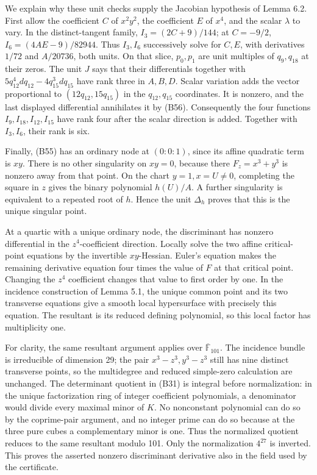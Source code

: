 \documentclass[
]{article}
\begin{document}
We explain why these unit checks supply the Jacobian hypothesis of Lemma
6.2. First allow the coefficient \(C\) of \(x^2y^2\), the coefficient
\(E\) of \(x^4\), and the scalar \(\lambda\) to vary. In the
distinct-tangent family, \(I_3=(2C+9)/144\); at \(C=-9/2\),
\(I_6=(4AE-9)/82944\). Thus \(I_3,I_6\) successively solve for \(C,E\),
with derivatives \(1/72\) and \(A/20736\), both units. On that slice,
\(p_0,p_1\) are unit multiples of \(q_9,q_{18}\) at their zeros. The
unit \(J\) says that their differentials together with
\(5q_{12}^4dq_{12}-4q_{15}^3dq_{15}\) have rank three in \(A,B,D\).
Scalar variation adds the vector proportional to \((12q_{12},15q_{15})\)
in the \(q_{12},q_{15}\) coordinates. It is nonzero, and the last
displayed differential annihilates it by (B56). Consequently the four
functions \(I_9,I_{18},I_{12},I_{15}\) have rank four after the scalar
direction is added. Together with \(I_3,I_6\), their rank is six.

Finally, (B55) has an ordinary node at \((0:0:1)\), since its affine
quadratic term is \(xy\). There is no other singularity on \(xy=0\),
because there \(F_z=x^3+y^3\) is nonzero away from that point. On the
chart \(y=1,x=U\ne0\), completing the square in \(z\) gives the binary
polynomial \(h(U)/A\). A further singularity is equivalent to a repeated
root of \(h\). Hence the unit \(\Delta_h\) proves that this is the
unique singular point.

At a quartic with a unique ordinary node, the discriminant has nonzero
differential in the \(z^4\)-coefficient direction. Locally solve the two
affine critical-point equations by the invertible \(xy\)-Hessian.
Euler's equation makes the remaining derivative equation four times the
value of \(F\) at that critical point. Changing the \(z^4\) coefficient
changes that value to first order by one. In the incidence construction
of Lemma 5.1, the unique common point and its two transverse equations
give a smooth local hypersurface with precisely this equation. The
resultant is its reduced defining polynomial, so this local factor has
multiplicity one.

For clarity, the same resultant argument applies over
\(\overline{\mathbb F}_{101}\). The incidence bundle is irreducible of
dimension 29; the pair \(x^3-z^3,y^3-z^3\) still has nine distinct
transverse points, so the multidegree and reduced simple-zero
calculation are unchanged. The determinant quotient in (B31) is integral
before normalization: in the unique factorization ring of integer
coefficient polynomials, a denominator would divide every maximal minor
of \(K\). No nonconstant polynomial can do so by the coprime-pair
argument, and no integer prime can do so because at the three pure cubes
a complementary minor is one. Thus the normalized quotient reduces to
the same resultant modulo 101. Only the normalization \(4^{27}\) is
inverted. This proves the asserted nonzero discriminant derivative also
in the field used by the certificate.
\end{document}
